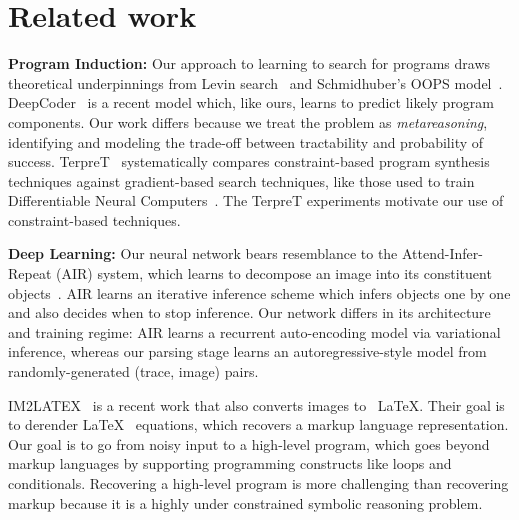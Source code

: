 \documentclass{article}
\theoremstyle{definition}
\begin{document}

\section{Related work}

\textbf{Program Induction:}
Our approach to learning to search for programs draws theoretical
underpinnings from Levin
search~\citep{levin1973universal,solomonoff1984optimum} and
Schmidhuber's OOPS model~\citep{schmidhuber2004optimal}.
DeepCoder~\citep{BalGauBroetal16} is a recent model which, like ours, learns to predict likely program components.
Our work differs because we treat
the problem as \emph{metareasoning}, identifying and modeling
the trade-off between tractability and probability of success.
TerpreT~\citep{gaunt2016terpret} 
systematically compares constraint-based program synthesis techniques
against gradient-based search techniques, like those used to train
Differentiable Neural Computers~\citep{graves2016hybrid}.  The TerpreT
experiments motivate our use of constraint-based techniques.



\textbf{Deep Learning:} Our neural network bears resemblance to the Attend-Infer-Repeat (AIR) system, which learns to decompose an image into its constituent objects~\citep{eslami1603attend}. AIR learns an iterative inference scheme which infers objects one by one and also decides when to stop inference.
Our network  differs in its architecture and training regime: AIR learns a recurrent auto-encoding model via variational inference, whereas our parsing stage learns an autoregressive-style model from randomly-generated (trace, image) pairs.

IM2LATEX~\citep{im2latex} is a recent work that also converts images to
~\LaTeX.
Their goal is to derender  \LaTeX~ equations,
which recovers a markup language representation.
Our goal is to go from
noisy input to a high-level program,
which goes beyond markup languages by supporting
programming constructs like loops and conditionals.
Recovering a high-level program is more challenging than recovering markup
because it is a highly under constrained symbolic reasoning problem.
\end{document}
